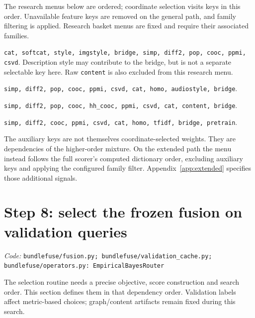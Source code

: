 \documentclass[11pt,a4paper]{article}
\newcommand{\code}[1]{\nolinkurl{#1}}
\newcommand{\src}[1]{\par\begingroup\raggedright\textit{Code: }\code{#1}\par\endgroup}
\numberwithin{equation}{section}
\begin{document}
The research menus below are ordered; coordinate selection visits keys in this order.
Unavailable feature keys are removed on the general path, and family filtering is applied.
Research basket menus are fixed and require their associated families.
\begin{description}[style=nextline]
\item[POG / POG Dense]
\code{cat, softcat, style, imgstyle, bridge, simp, diff2, pop, cooc, ppmi, csvd}.
Description style may contribute to the bridge, but is not a separate selectable key here.
Raw \code{content} is also excluded from this research menu.
\item[Spotify / Spotify Sparse]
\code{simp, diff2, pop, cooc, ppmi, csvd, cat, homo, audiostyle, bridge}.
\item[Research retail]
\code{simp, diff2, pop, cooc, hh_cooc, ppmi, csvd, cat, content, bridge}.
\item[Research commerce]
\code{simp, diff2, cooc, ppmi, csvd, cat, homo, tfidf, bridge, pretrain}.
\end{description}
The auxiliary keys are not themselves coordinate-selected weights. They are dependencies
of the higher-order mixture. On the extended path the menu instead follows the full
scorer's computed dictionary order, excluding auxiliary keys and applying the configured
family filter. Appendix~\ref{app:extended} specifies those additional signals.

\section{Step 8: select the frozen fusion on validation queries}\label{sec:selection}
\src{bundlefuse/fusion.py; bundlefuse/validation_cache.py; bundlefuse/operators.py: EmpiricalBayesRouter}
The selection routine needs a precise objective, score construction and search order.
This section defines them in that dependency order. Validation labels affect metric-based
choices; graph/content artifacts remain fixed during this search.
\end{document}
